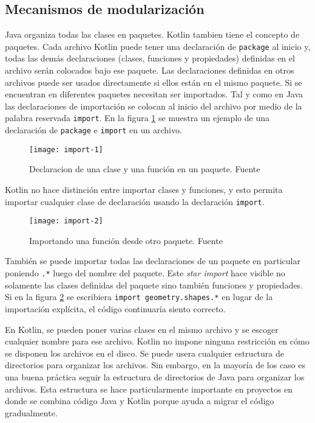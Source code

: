 \subsection{Mecanismos de modularización}
Java organiza todas las clases en paquetes. Kotlin tambien tiene el concepto de paquetes. Cada archivo Kotlin puede tener una declaración de \texttt{package} al inicio y, todas las demás declaraciones (clases, funciones y propiedades) definidas en el archivo serán colocados bajo ese paquete. Las declaraciones definidas en otros archivos puede ser usados directamente si ellos están en el mismo paquete. Si se encuentran en diferentes paquetes necesitan ser importados. Tal y como en Java las declaraciones de importación se colocan al inicio del archivo por medio de la palabra reservada \texttt{import}. En la figura \ref{fig:import-1} se muestra un ejemplo de una declaración de \texttt{package} e \texttt{import} en un archivo.

\begin{figure}[h!]
  \texttt{[image: import-1]}
  \caption{Declaracion de una clase y una función en un paquete. Fuente \cite{kotlin-in-action}}
  \label{fig:import-1}
\end{figure}  

Kotlin no hace distinción entre importar clases y funciones, y esto permita importar cualquier clase de declaración usando la declaración \texttt{import}.

\begin{figure}[h!]
  \texttt{[image: import-2]}
  \caption{Importando una función desde otro paquete. Fuente \cite{kotlin-in-action}}
  \label{fig:import-2}
\end{figure}

También se puede importar todas las declaraciones de un paquete en particular poniendo \texttt{.*} luego del nombre del paquete. Este \emph{star import} hace visible no solamente las clases definidas del paquete sino también funciones y propiedades. Si en la figura \ref{fig:import-2} se escribiera \texttt{import geometry.shapes.*} en lugar de la importación explícita, el código continuaría siento correcto.

En Kotlin, se pueden poner varias clases en el mismo archivo y se escoger cualquier nombre para ese archivo. Kotlin no impone ninguna restricción en cómo se disponen los archivos en el disco. Se puede usera cualquier estructura de directorios para organizar los archivos. Sin embargo, en la mayoría de los caso es una buena práctica seguir la estructura de directorios de Java para organizar los archivos. Esta estructura se hace particularmente importante en proyectos en donde se combina código Java y Kotlin porque ayuda a migrar el código gradualmente.

